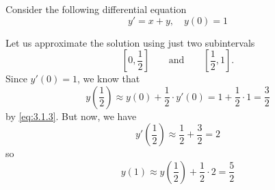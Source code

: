 \documentclass{ximera}
\begin{document}
\begin{example}\label{ex:eulerIntro1}
Consider the following differential equation
$$y' = x+y,\quad y(0)=1$$

Let us approximate the solution using just two subintervals
$$
\left[0,\frac{1}{2}\right]\qquad\text{and}\qquad \left[\frac{1}{2},1\right].
$$
Since $y'(0) = 1$, we know that
$$
y\left(\frac{1}{2}\right)\approx y(0)+\frac{1}{2}\cdot y'(0)= 1+ \frac{1}{2}\cdot 1 = \frac{3}{2}
$$
by \eqref{eq:3.1.3}.
But now, we have
$$
y'\left(\frac{1}{2}\right) \approx \frac{1}{2}+\frac{3}{2} = 2
$$
so
$$
y(1) \approx  y\left(\frac{1}{2}\right)+\frac{1}{2} \cdot 2= \frac{5}{2}
$$

\end{example}
\end{document}
